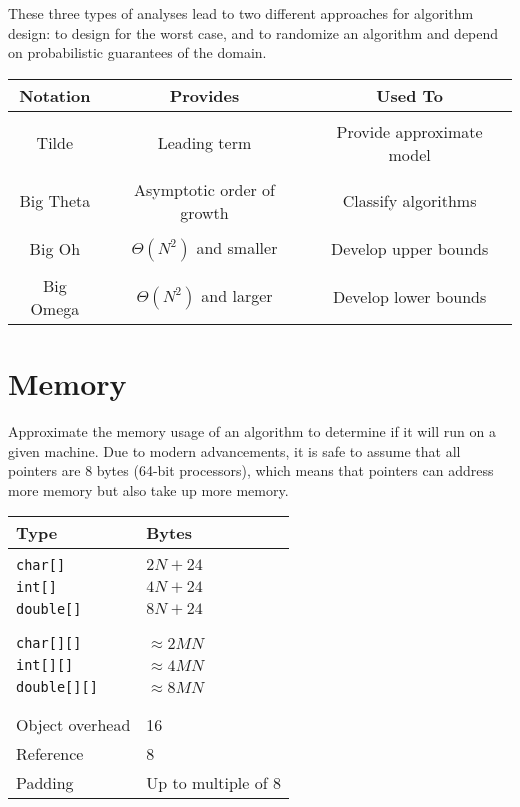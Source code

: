 \documentclass[11pt]{article}
\begin{document}
	These three types of analyses lead to two different approaches for algorithm design: to design for the worst case, and to randomize an algorithm and depend on probabilistic guarantees of the domain.
	
	\begin{center}
	\begin{tabular}[t]{ccc}
	Notation	&	Provides	&	Used To\\\hline
	\\Tilde		&	Leading term	&	Provide approximate model\\\\
	Big Theta	&	Asymptotic order of growth	&	Classify algorithms\\\\
	Big Oh		&	$\Theta (N^2)$ and smaller	&	Develop upper bounds\\\\
	Big Omega	&	$\Theta (N^2)$ and larger	&	Develop lower bounds
	\end{tabular}
	\end{center}
	
\section{Memory}
	Approximate the memory usage of an algorithm to determine if it will run on a given machine. Due to modern advancements, it is safe to assume that all pointers are 8 bytes (64-bit processors), which means that pointers can address more memory but also take up more memory.
	
	\begin{center}
	\begin{tabular}[t]{l l}
	\textbf{Type}	&	\textbf{Bytes}	\\\hline
	\\\verb|char[]|	&	$2N + 24$\\
	\verb|int[]|	&	$4N + 24$\\
	\verb|double[]|	&	$8N + 24$\\\\\hline
	\\\verb|char[][]|	&	$\approx 2MN$\\
	\verb|int[][]|	&	$\approx 4MN$\\
	\verb|double[][]|	&	$\approx 8MN$\\\\\hline
	\\Object overhead	&	16\\
	Reference		&	8\\
	Padding			&	Up to multiple of 8
	\end{tabular}
	\end{center}
\end{document}

